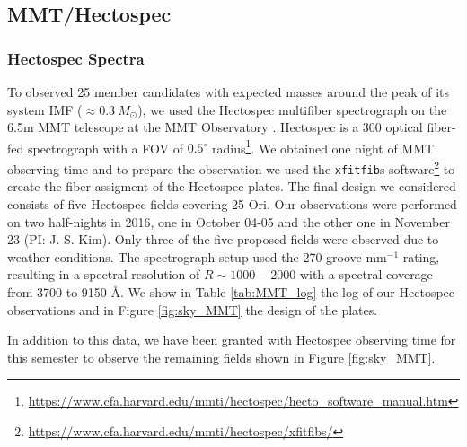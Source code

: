 \documentclass[12pt]{article}
\begin{document}
\subsection{MMT/Hectospec}
\label{sec:Hectospec}

\subsubsection{Hectospec Spectra}
\label{sec_hectospec:spectra}
To observed 25 member candidates with expected masses around the peak of its system IMF ($\approx0.3\ M_\odot$), we used the Hectospec multifiber spectrograph on the 6.5m MMT telescope at the MMT Observatory \citep{Fabricant2005}. Hectospec is a 300 optical fiber-fed spectrograph with a FOV of $0.5^\circ$ radius\footnote{\url{https://www.cfa.harvard.edu/mmti/hectospec/hecto_software_manual.htm}}. We obtained one night of MMT observing time and to prepare the observation we used the \texttt{xfitfib}s software\footnote{\url{https://www.cfa.harvard.edu/mmti/hectospec/xfitfibs/}} to create the fiber assigment of the Hectospec plates. The final design we considered consists of five Hectospec fields covering 25 Ori. Our observations were performed on two half-nights in 2016, one in October 04-05 and the other one in November 23 (PI: J. S. Kim). Only three of the five proposed fields were observed due to weather conditions. The spectrograph setup used the 270 groove mm$^{-1}$ rating, resulting in a spectral resolution of $R\sim1000-2000$ with a spectral coverage from 3700 to 9150 \AA. We show in Table \ref{tab:MMT_log} the log of our Hectospec observations and in Figure \ref{fig:sky_MMT} the design of the plates.

In addition to this data, we have been granted with Hectospec observing time for this semester to observe the remaining fields shown in Figure \ref{fig:sky_MMT}.
\end{document}
